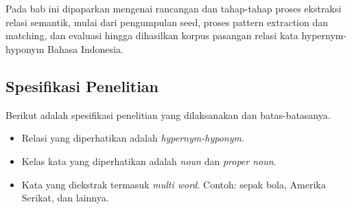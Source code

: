 \chapter{\babTiga}
Pada bab ini dipaparkan mengenai rancangan dan tahap-tahap proses ekstraksi relasi semantik, mulai dari pengumpulan seed, proses pattern extraction dan matching, dan evaluasi hingga dihasilkan korpus pasangan relasi kata hypernym-hyponym Bahasa Indonesia. 


\section{Spesifikasi Penelitian}
Berikut adalah spesifikasi penelitian yang dilaksanakan dan batas-batasanya.
\begin{itemize}
  \item Relasi yang diperhatikan adalah \textit{hypernym-hyponym}.
  \item Kelas kata yang diperhatikan adalah \textit{noun} dan \textit{proper noun}.
  \item Kata yang diekstrak termasuk \textit{multi word}. Contoh: sepak bola, Amerika Serikat, dan lainnya.
\end{itemize}


